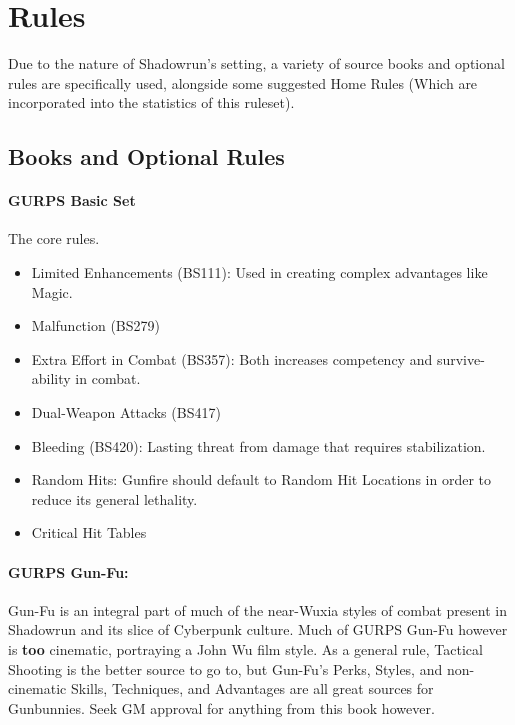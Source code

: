 \section{Rules}

\begin{multicols*}{3}
	
	Due to the nature of Shadowrun's setting, a variety of source books and optional rules are specifically used, alongside some suggested Home Rules (Which are incorporated into the statistics of this ruleset).
	
	\subsection{Books and Optional Rules}
	
	\paragraph{GURPS Basic Set}
	The core rules.
	\begin{itemize}
		\itemsep0em 
		\item Limited Enhancements (BS111): Used in creating complex advantages like Magic.
		\item Malfunction (BS279)
		\item Extra Effort in Combat (BS357): Both increases competency and survive-ability in combat.
		\item Dual-Weapon Attacks (BS417)
		\item Bleeding (BS420): Lasting threat from damage that requires stabilization.
		\item Random Hits: Gunfire should default to Random Hit Locations in order to reduce its general lethality.
		\item Critical Hit Tables
	\end{itemize}
	
	\paragraph{GURPS Gun-Fu:}
	Gun-Fu is an integral part of much of the near-Wuxia styles of combat present in Shadowrun and its slice of Cyberpunk culture. Much of GURPS Gun-Fu however is \textbf{too} cinematic, portraying a John Wu film style. As a general rule, Tactical Shooting is the better source to go to, but Gun-Fu's Perks, Styles, and non-cinematic Skills, Techniques, and Advantages are all great sources for Gunbunnies. Seek GM approval for anything from this book however.
	

\end{multicols*}
